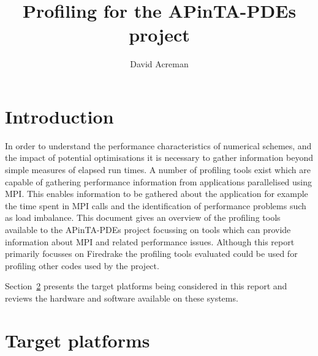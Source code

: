 \documentclass[a4paper,titlepage]{article}
\author{David Acreman}
\title{Profiling for the APinTA-PDEs project}
\begin{document}
\pagestyle{fancy}
\lhead{}
\chead{}

\maketitle
\pagebreak
\tableofcontents
\pagebreak

\section{Introduction}

In order to understand the performance characteristics of numerical schemes, and the impact of potential optimisations it is necessary to gather information beyond simple measures of elapsed run times. A number of profiling tools exist which are capable of gathering performance information from applications parallelised using MPI. This enables information to be gathered about the application for example the time spent in MPI calls and the identification of performance problems such as load imbalance. This document gives an overview of the profiling tools available to the APinTA-PDEs project focussing on tools which can provide information about MPI and related performance issues. Although this report primarily focusses on Firedrake the profiling tools evaluated could be used for profiling other codes used by the project.

Section~\ref{section:target_platforms} presents the target platforms being considered in this report and reviews the hardware and software available on these systems. 

\section{Target platforms}
\label{section:target_platforms}
\end{document}
